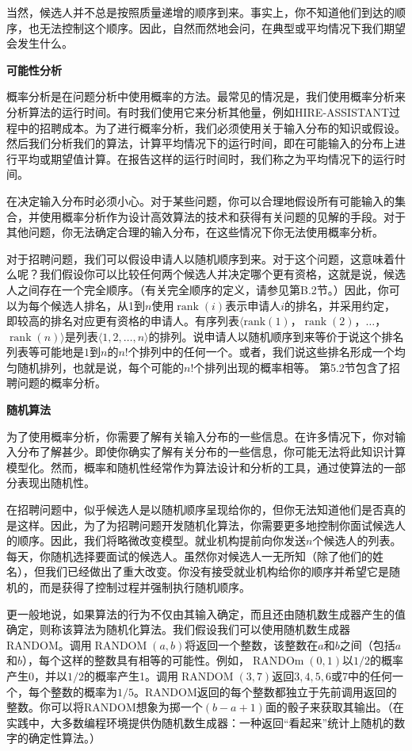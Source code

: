 \documentclass[lang=cn,newtx,10pt,scheme=chinese]{elegantbook}
\begin{document}
当然，候选人并不总是按照质量递增的顺序到来。事实上，你不知道他们到达的顺序，也无法控制这个顺序。因此，自然而然地会问，在典型或平均情况下我们期望会发生什么。

\textbf{可能性分析}

概率分析是在问题分析中使用概率的方法。最常见的情况是，我们使用概率分析来分析算法的运行时间。有时我们使用它来分析其他量，例如HIRE-ASSISTANT过程中的招聘成本。为了进行概率分析，我们必须使用关于输入分布的知识或假设。然后我们分析我们的算法，计算平均情况下的运行时间，即在可能输入的分布上进行平均或期望值计算。在报告这样的运行时间时，我们称之为平均情况下的运行时间。

在决定输入分布时必须小心。对于某些问题，你可以合理地假设所有可能输入的集合，并使用概率分析作为设计高效算法的技术和获得有关问题的见解的手段。对于其他问题，你无法确定合理的输入分布，在这些情况下你无法使用概率分析。

对于招聘问题，我们可以假设申请人以随机顺序到来。对于这个问题，这意味着什么呢？我们假设你可以比较任何两个候选人并决定哪个更有资格，这就是说，候选人之间存在一个完全顺序。（有关完全顺序的定义，请参见第B.2节。）因此，你可以为每个候选人排名，从1到$n$使用$\operatorname{rank}(i)$表示申请人$i$的排名，并采用约定，即较高的排名对应更有资格的申请人。有序列表$\langle\operatorname{rank(1)}$，$\operatorname{rank}(2)$，$\ldots$，$\operatorname{rank}(n)\rangle$是列表$\langle 1,2,\ldots,n\rangle$的排列。说申请人以随机顺序到来等价于说这个排名列表等可能地是$1$到$n$的$n$!个排列中的任何一个。或者，我们说这些排名形成一个均匀随机排列，也就是说，每个可能的$n$!个排列出现的概率相等。
第5.2节包含了招聘问题的概率分析。

\textbf{随机算法}

为了使用概率分析，你需要了解有关输入分布的一些信息。在许多情况下，你对输入分布了解甚少。即使你确实了解有关分布的一些信息，你可能无法将此知识计算模型化。然而，概率和随机性经常作为算法设计和分析的工具，通过使算法的一部分表现出随机性。

在招聘问题中，似乎候选人是以随机顺序呈现给你的，但你无法知道他们是否真的是这样。因此，为了为招聘问题开发随机化算法，你需要更多地控制你面试候选人的顺序。因此，我们将略微改变模型。就业机构提前向你发送$n$个候选人的列表。每天，你随机选择要面试的候选人。虽然你对候选人一无所知（除了他们的姓名），但我们已经做出了重大改变。你没有接受就业机构给你的顺序并希望它是随机的，而是获得了控制过程并强制执行随机顺序。

更一般地说，如果算法的行为不仅由其输入确定，而且还由随机数生成器产生的值确定，则称该算法为随机化算法。我们假设我们可以使用随机数生成器RANDOM。调用$\operatorname{RANDOM}(a,b)$将返回一个整数，该整数在$a$和$b$之间（包括$a$和$b$），每个这样的整数具有相等的可能性。例如，$\operatorname{RANDOm}(0,1)$以$1/2$的概率产生0，并以$1/2$的概率产生1。调用$\operatorname{RANDOM}(3,7)$返回$3,4,5,6$或7中的任何一个，每个整数的概率为$1/5$。RANDOM返回的每个整数都独立于先前调用返回的整数。你可以将RANDOM想象为掷一个$(b-a+1)$面的骰子来获取其输出。（在实践中，大多数编程环境提供伪随机数生成器：一种返回“看起来”统计上随机的数字的确定性算法。）
\end{document}

